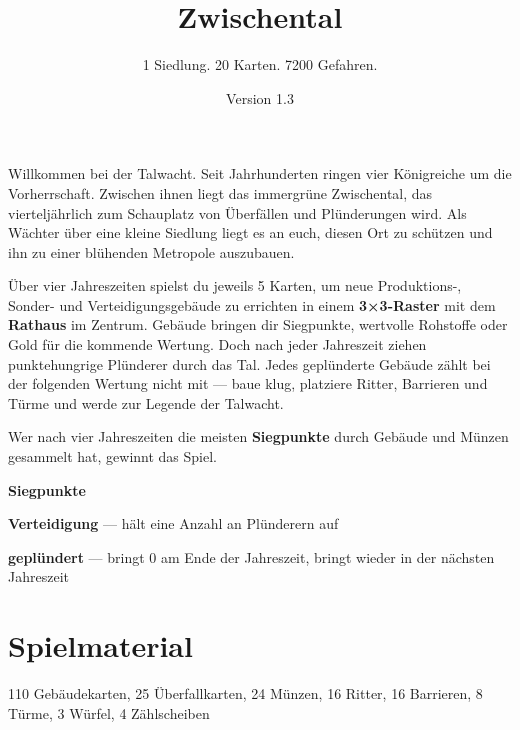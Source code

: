 \documentclass[11pt]{article}
\title{Zwischental}
\author{1 Siedlung. 20 Karten. 7200 Gefahren.}
\date{Version 1.3}
\begin{document}
\begin{lumenpage}
\maketitle

\begin{lumenquote}
Willkommen bei der Talwacht. Seit Jahrhunderten ringen vier Königreiche um die Vorherrschaft. Zwischen ihnen liegt das immergrüne Zwischental, das vierteljährlich zum Schauplatz von Überfällen und Plünderungen wird. Als Wächter über eine kleine Siedlung liegt es an euch, diesen Ort zu schützen und ihn zu einer blühenden Metropole auszubauen.
\end{lumenquote}

Über vier Jahreszeiten spielst du jeweils 5 Karten, um neue Produktions-, Sonder- und Verteidigungsgebäude zu errichten  in einem \textbf{3×3-Raster} mit dem \textbf{Rathaus} im Zentrum. Gebäude bringen dir Siegpunkte, wertvolle Rohstoffe oder Gold für die kommende Wertung. Doch nach jeder Jahreszeit ziehen punktehungrige Plünderer durch das Tal. Jedes geplünderte Gebäude zählt bei der folgenden Wertung nicht mit --- baue klug, platziere Ritter, Barrieren und Türme und werde zur Legende der Talwacht.

\begin{lumenexample}
Wer nach vier Jahreszeiten die meisten \lumenVP\textbf{Siegpunkte} durch Gebäude und Münzen gesammelt hat, gewinnt das Spiel.
\end{lumenexample}

\par\vspace{4pt}

\lumenVP\textbf{ Siegpunkte}\par
\lumenDef\textbf{ Verteidigung} --- hält eine Anzahl an Plünderern auf\par
\lumenPlundered\textbf{ geplündert} --- bringt 0\lumenVP\textbf{} am Ende der Jahreszeit, bringt wieder \lumenVP\textbf{} in der nächsten Jahreszeit\par

\chapter{Spielmaterial}

110 Gebäudekarten,
25 Überfallkarten,
24 Münzen,
16 Ritter,
16 Barrieren,
8 Türme,
3 Würfel,
4 Zählscheiben


\end{lumenpage}
\end{document}
